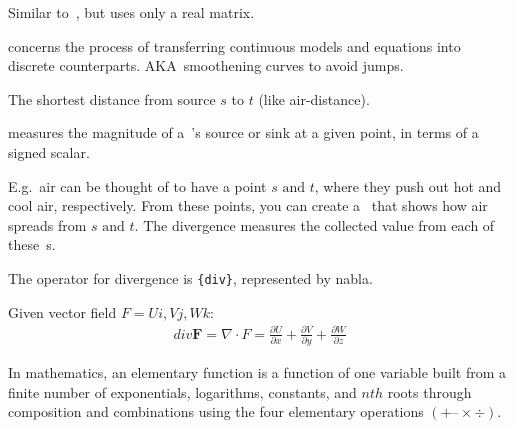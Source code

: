 \begin{definition}
    Similar to~, but uses only a real matrix.

\end{definition}

\begin{definition}[Discretization]
    concerns the process of transferring
    continuous models and equations into discrete counterparts. 
    AKA\ smoothening curves to avoid jumps.

\end{definition}

\begin{definition}[Displacement]
    The shortest distance from source $s$ to $t$ (like air-distance).

\end{definition}

\begin{definition}[Divergence]\label{divergence}
    measures the magnitude of a~'s source or sink at a
    given point, in terms of a signed scalar.

    E.g.\ air can be thought of to have a point $s \text{ and } t$, where they
    push out hot and cool air, respectively. From these points, you can create
    a~ that shows how air spreads from $s \text{ and }
    t$. The divergence measures the collected value from each of 
    these~s.

    The operator for divergence is \verb|{div}|, represented by nabla.

    Given vector field $F = Ui, Vj, Wk$:
    \begin{align}
            div \textbf{F} = \nabla \cdot F = 
            \frac{\partial{U}}{\partial{x}}+
            \frac{\partial{V}}{\partial{y}} +
            \frac{\partial{W}}{\partial{z}}
    \end{align}

\end{definition}

\begin{definition}
    In mathematics, an elementary function is a function of one variable built
    from a finite number of exponentials, logarithms, constants, and $nth$ roots
    through composition and combinations using the four elementary operations
    $(+ – × ÷)$.

\end{definition}

